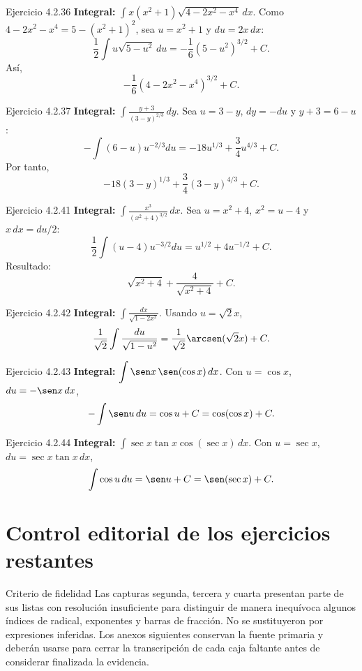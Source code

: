 \begin{examplebox}{Ejercicio 4.2.36}
\textbf{Integral:} $\displaystyle \int x(x^2+1)\sqrt{4-2x^2-x^4}\,dx$.
Como $4-2x^2-x^4=5-(x^2+1)^2$, sea $u=x^2+1$ y $du=2x\,dx$:
\[
 \frac12\int u\sqrt{5-u^2}\,du
 =-\frac16(5-u^2)^{3/2}+C.
\]
Así,
\[
 -\frac16(4-2x^2-x^4)^{3/2}+C.
\]
\end{examplebox}

\begin{examplebox}{Ejercicio 4.2.37}
\textbf{Integral:} $\displaystyle \int\frac{y+3}{(3-y)^{2/3}}\,dy$.
Sea $u=3-y$, $dy=-du$ y $y+3=6-u$:
\[
 -\int(6-u)u^{-2/3}du
 =-18u^{1/3}+\frac34u^{4/3}+C.
\]
Por tanto,
\[
 -18(3-y)^{1/3}+\frac34(3-y)^{4/3}+C.
\]
\end{examplebox}

\begin{examplebox}{Ejercicio 4.2.41}
\textbf{Integral:} $\displaystyle \int\frac{x^3}{(x^2+4)^{3/2}}\,dx$.
Sea $u=x^2+4$, $x^2=u-4$ y $x\,dx=du/2$:
\[
 \frac12\int(u-4)u^{-3/2}du
 =u^{1/2}+4u^{-1/2}+C.
\]
Resultado:
\[
 \sqrt{x^2+4}+\frac{4}{\sqrt{x^2+4}}+C.
\]
\end{examplebox}

\begin{examplebox}{Ejercicio 4.2.42}
\textbf{Integral:} $\displaystyle \int\frac{dx}{\sqrt{1-2x^2}}$.
Usando $u=\sqrt2x$,
\[
 \frac1{\sqrt2}\int\frac{du}{\sqrt{1-u^2}}
 =\frac1{\sqrt2}\arcsen(\sqrt2x)+C.
\]
\end{examplebox}

\begin{examplebox}{Ejercicio 4.2.43}
\textbf{Integral:} $\displaystyle \int\sen x\,\sen(\cos x)\,dx$.
Con $u=\cos x$, $du=-\sen x\,dx$,
\[
 -\int\sen u\,du=\cos u+C=\cos(\cos x)+C.
\]
\end{examplebox}

\begin{examplebox}{Ejercicio 4.2.44}
\textbf{Integral:} $\displaystyle \int\sec x\tan x\cos(\sec x)\,dx$.
Con $u=\sec x$, $du=\sec x\tan x\,dx$,
\[
 \int\cos u\,du=\sen u+C=\sen(\sec x)+C.
\]
\end{examplebox}

\section{Control editorial de los ejercicios restantes}
\begin{sourcebox}{Criterio de fidelidad}
Las capturas segunda, tercera y cuarta presentan parte de sus listas con resolución insuficiente para distinguir de manera inequívoca algunos índices de radical, exponentes y barras de fracción. No se sustituyeron por expresiones inferidas. Los anexos siguientes conservan la fuente primaria y deberán usarse para cerrar la transcripción de cada caja faltante antes de considerar finalizada la evidencia.
\end{sourcebox}

